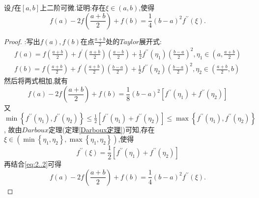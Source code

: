 \documentclass[lang=cn,newtx,10pt,scheme=chinese]{elegantbook}
\begin{document}
\begin{example}
    设\(f\)在\([a,b]\)上二阶可微.证明:存在\(\xi\in(a,b)\),使得
    \begin{equation}
        f(a)-2f\left(\frac{a + b}{2}\right)+f(b)=\frac{1}{4}(b - a)^{2}f^{\prime\prime}(\xi).
        \nonumber
    \end{equation}
    \begin{proof}
        {\color{blue} }:写出$f(a),f(b)$在点$\frac{a+b}{2}$处的$Taylor$展开式:
        \begin{gather}
            f(a)=f\left( \frac{a+b}{2} \right) +f^{\prime}\left( \frac{a+b}{2} \right) \left( \frac{a-b}{2} \right) +\frac{1}{2}f^{\prime\prime}(\eta _1)\left( \frac{b-a}{2} \right) ^2,\eta _1\in \left( a,\frac{a+b}{2} \right) 
            \nonumber\\
f(b)=f\left( \frac{a+b}{2} \right) +f^{\prime}\left( \frac{a+b}{2} \right) \left( \frac{b-a}{2} \right) +\frac{1}{2}f^{\prime\prime}(\eta _2)\left( \frac{b-a}{2} \right) ^2,\eta _2\in \left( \frac{a+b}{2},b \right) 
            \nonumber
        \end{gather}
        然后将两式相加,就有
        \begin{equation}\label{eq:2..2}
            f\left( a \right) -2f\left( \frac{a+b}{2} \right) +f\left( b \right) =\frac{1}{8}\left( b-a \right) ^2\left[ f^{\prime\prime}\left( \eta _1 \right) +f^{\prime\prime}\left( \eta _2 \right) \right]
        \end{equation}
        又$\min \left\{ f^{\prime\prime}\left( \eta _1 \right) ,f^{\prime\prime}\left( \eta _2 \right) \right\} \le \frac{1}{2}\left[ f^{\prime\prime}\left( \eta _1 \right) +f^{\prime\prime}\left( \eta _2 \right) \right] \le \max \left\{ f^{\prime\prime}\left( \eta _1 \right) ,f^{\prime\prime}\left( \eta _2 \right) \right\}$,
        故由$Darboux$定理(定理\ref{Darboux定理})可知,存在$\xi\in\left( \min \left\{ \eta _1,\eta _2 \right\} ,\max \left\{ \eta _1,\eta _2 \right\} \right)$,使得
        \begin{equation}
            f^{\prime\prime}\left( \xi \right) =\frac{1}{2}\left[ f^{\prime\prime}\left( \eta _1 \right) +f^{\prime\prime}\left( \eta _2 \right) \right]
            \nonumber
        \end{equation}
        再结合\eqref{eq:2..2}可得
        \begin{equation}
            f(a)-2f\left(\frac{a + b}{2}\right)+f(b)=\frac{1}{4}(b - a)^{2}f^{\prime\prime}(\xi).
            \nonumber
        \end{equation}


\end{proof}
\end{example}
\end{document}
